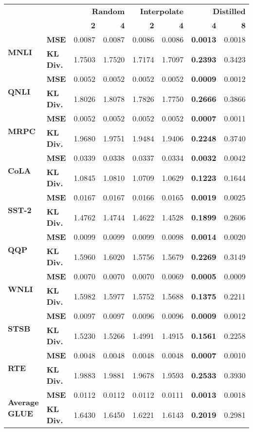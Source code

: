 \begin{tabular}{llrrrrrr}
 &  & \multicolumn{2}{r}{\bfseries Random} & \multicolumn{2}{r}{\bfseries Interpolate} & \multicolumn{2}{r}{\bfseries Distilled} \\
 &  & \bfseries 2 & \bfseries 4 & \bfseries 2 & \bfseries 4 & \bfseries 4 & \bfseries 8 \\
\multirow[c]{2}{*}{\bfseries MNLI} & \bfseries MSE & 0.0087 & 0.0087 & 0.0086 & 0.0086 & \bfseries 0.0013 & 0.0018 \\
\bfseries  & \bfseries KL Div. & 1.7503 & 1.7520 & 1.7174 & 1.7097 & \bfseries 0.2393 & 0.3423 \\
\multirow[c]{2}{*}{\bfseries QNLI} & \bfseries MSE & 0.0052 & 0.0052 & 0.0052 & 0.0052 & \bfseries 0.0009 & 0.0012 \\
\bfseries  & \bfseries KL Div. & 1.8026 & 1.8078 & 1.7826 & 1.7750 & \bfseries 0.2666 & 0.3866 \\
\multirow[c]{2}{*}{\bfseries MRPC} & \bfseries MSE & 0.0052 & 0.0052 & 0.0052 & 0.0052 & \bfseries 0.0007 & 0.0011 \\
\bfseries  & \bfseries KL Div. & 1.9680 & 1.9751 & 1.9484 & 1.9406 & \bfseries 0.2248 & 0.3740 \\
\multirow[c]{2}{*}{\bfseries CoLA} & \bfseries MSE & 0.0339 & 0.0338 & 0.0337 & 0.0334 & \bfseries 0.0032 & 0.0042 \\
\bfseries  & \bfseries KL Div. & 1.0845 & 1.0810 & 1.0709 & 1.0629 & \bfseries 0.1223 & 0.1644 \\
\multirow[c]{2}{*}{\bfseries SST-2} & \bfseries MSE & 0.0167 & 0.0167 & 0.0166 & 0.0165 & \bfseries 0.0019 & 0.0025 \\
\bfseries  & \bfseries KL Div. & 1.4762 & 1.4744 & 1.4622 & 1.4528 & \bfseries 0.1899 & 0.2606 \\
\multirow[c]{2}{*}{\bfseries QQP} & \bfseries MSE & 0.0099 & 0.0099 & 0.0099 & 0.0098 & \bfseries 0.0014 & 0.0020 \\
\bfseries  & \bfseries KL Div. & 1.5960 & 1.6020 & 1.5756 & 1.5679 & \bfseries 0.2269 & 0.3149 \\
\multirow[c]{2}{*}{\bfseries WNLI} & \bfseries MSE & 0.0070 & 0.0070 & 0.0070 & 0.0069 & \bfseries 0.0005 & 0.0009 \\
\bfseries  & \bfseries KL Div. & 1.5982 & 1.5977 & 1.5752 & 1.5688 & \bfseries 0.1375 & 0.2211 \\
\multirow[c]{2}{*}{\bfseries STSB} & \bfseries MSE & 0.0097 & 0.0097 & 0.0096 & 0.0096 & \bfseries 0.0009 & 0.0012 \\
\bfseries  & \bfseries KL Div. & 1.5230 & 1.5266 & 1.4991 & 1.4915 & \bfseries 0.1561 & 0.2258 \\
\multirow[c]{2}{*}{\bfseries RTE} & \bfseries MSE & 0.0048 & 0.0048 & 0.0048 & 0.0048 & \bfseries 0.0007 & 0.0010 \\
\bfseries  & \bfseries KL Div. & 1.9883 & 1.9881 & 1.9678 & 1.9593 & \bfseries 0.2533 & 0.3930 \\
\multirow[c]{2}{*}{\bfseries Average GLUE} & \bfseries MSE & 0.0112 & 0.0112 & 0.0112 & 0.0111 & \bfseries 0.0013 & 0.0018 \\
\bfseries  & \bfseries KL Div. & 1.6430 & 1.6450 & 1.6221 & 1.6143 & \bfseries 0.2019 & 0.2981 \\
\end{tabular}
